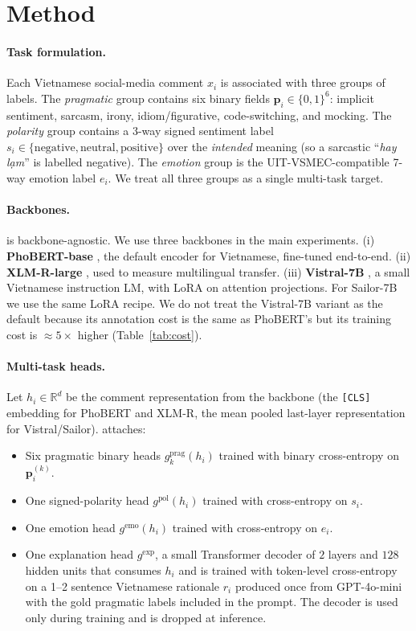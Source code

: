 \section{Method}
\label{sec:method}

\paragraph{Task formulation.}
Each Vietnamese social-media comment $x_i$ is associated with three
groups of labels. The \emph{pragmatic} group contains six binary
fields $\mathbf{p}_i\in\{0,1\}^6$: implicit sentiment, sarcasm, irony,
idiom/figurative, code-switching, and mocking. The \emph{polarity}
group contains a 3-way signed sentiment label
$s_i\in\{\text{negative}, \text{neutral}, \text{positive}\}$ over the
\emph{intended} meaning (so a sarcastic ``\textit{hay l\d{a}m}'' is
labelled negative). The \emph{emotion} group is the
UIT-VSMEC-compatible 7-way emotion label $e_i$. We treat all three
groups as a single multi-task target.

\paragraph{Backbones.}
\method{} is backbone-agnostic. We use three backbones in the main
experiments. (i) \textbf{PhoBERT-base}
\citep{phobert2020}, the default encoder for Vietnamese, fine-tuned
end-to-end. (ii) \textbf{XLM-R-large}
\citep{conneau2020xlmr}, used to measure multilingual transfer.
(iii) \textbf{Vistral-7B} \citep{vistral2024}, a small Vietnamese
instruction LM, with LoRA \citep{hu2022lora} on attention projections.
For Sailor-7B \citep{sailor2024} we use the same LoRA recipe. We do not
treat the Vistral-7B variant as the default because its annotation
cost is the same as PhoBERT's but its training cost is $\approx 5\times$
higher (Table~\ref{tab:cost}).

\paragraph{Multi-task heads.}
Let $h_i\in\mathbb{R}^d$ be the comment representation from the
backbone (the \texttt{[CLS]} embedding for PhoBERT and XLM-R, the
mean pooled last-layer representation for Vistral/Sailor). \method{}
attaches:
\begin{itemize}\itemsep1pt
  \item Six pragmatic binary heads $g^{\text{prag}}_k(h_i)$ trained
    with binary cross-entropy on $\mathbf{p}_i^{(k)}$.
  \item One signed-polarity head $g^{\text{pol}}(h_i)$ trained with
    cross-entropy on $s_i$.
  \item One emotion head $g^{\text{emo}}(h_i)$ trained with
    cross-entropy on $e_i$.
  \item One explanation head $g^{\text{exp}}$, a small Transformer
    decoder of $2$ layers and $128$ hidden units that consumes $h_i$
    and is trained with token-level cross-entropy on a 1--2 sentence
    Vietnamese rationale $r_i$ produced once from GPT-4o-mini with
    the gold pragmatic labels included in the prompt. The decoder is
    used only during training and is dropped at inference.
\end{itemize}

